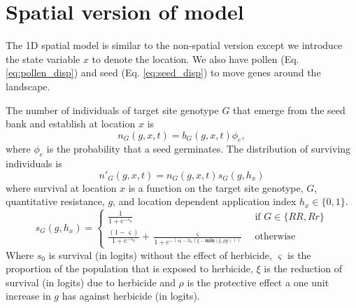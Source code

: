 \documentclass[12pt,a4paper]{article}
\begin{document}
\section*{Spatial version of model}
The 1D spatial model is similar to the non-spatial version except we introduce the state variable $x$ to denote the location. We also have pollen (Eq. \ref{eq:pollen_disp}) and seed (Eq. \ref{eq:seed_disp}) to move genes around the landscape. 

The number of individuals of target site genotype $G$ that emerge from the seed bank and establish at location $x$ is 
\begin{equation}\label{eq:above_ground}
	n_G(g, x, t) = b_G(g, x, t)\phi_e,
\end{equation}
where $\phi_e$ is the probability that a seed germinates. The distribution of surviving individuals is 
\begin{equation}\label{eq:abg_sur}
	n'_G(g, x, t) = n_G(g, x, t)s_G(g, h_x) 
\end{equation}
where survival at location $x$ is a function on the target site genotype, $G$, quantitative resistance, $g$, and location dependent application index $h_x \in \{0, 1\}$.   
\begin{equation}\label{eq:sur_G}
	s_G(g, h_x) = \begin{cases} 
		\frac{1}{1 + e^{-s_0}} &\text{~if~} G \in \{RR, Rr\} \\
		\frac{(1 - \varsigma)}{1 + e^{-s_0}} + \frac{\varsigma}{1 + e^{-\left(s_0 - h_x\left(\xi - \textbf{min}(\xi, \rho g) \right)\right)}} &\text{~otherwise~} 		
	\end{cases} 
\end{equation}  
Where $s_0$ is survival (in logits) without the effect of herbicide, $\varsigma$ is the proportion of the population that is exposed to herbicide, $\xi$ is the reduction of survival (in logits) due to herbicide and $\rho$ is the protective effect a one unit increase in $g$ has against herbicide (in logits).   
\end{document}
